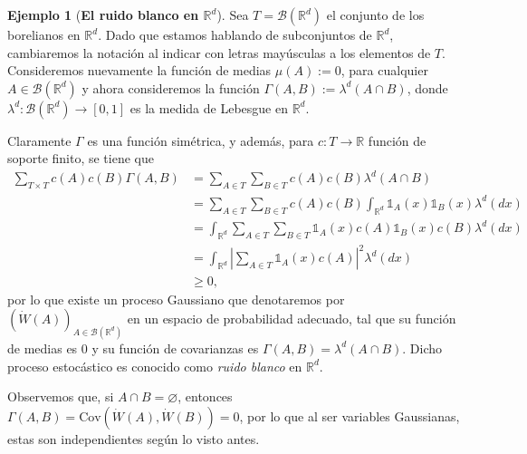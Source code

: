 \documentclass[letterpaper,twoside]{book}
\newcommand{\R}{\mathbb{R}}
\newcommand{\B}{\mathcal{B}}
\newcommand{\W}{\dot{W}}
\newcommand{\1}{\mathds{1}}
\newcommand{\abs}[1]{\left\lvert #1 \right\rvert}
\renewcommand{\to}{\rightarrow}
\theoremstyle{definition}
\theoremstyle{definition}
\theoremstyle{definition}
\theoremstyle{definition}
\theoremstyle{definition}
\theoremstyle{definition}
\newtheorem{ejem}{Ejemplo}
\theoremstyle{definition}
\begin{document}
\begin{ejem}[\textbf{El ruido blanco en $\R^{d}$}] 
Sea $T=\B(\R^{d})$ el conjunto de los borelianos en $\R^d$.
Dado que estamos hablando de subconjuntos de $\R^{d}$, cambiaremos la notación al indicar con letras mayúsculas a los elementos de $T$.
Consideremos nuevamente la función de medias $\mu(A):=0$, para cualquier $A\in \B(\R^{d})$ y ahora consideremos la función $\Gamma(A,B):=\lambda^{d}(A\cap B)$, donde $\lambda^{d}:\B(\R^{d})\to [0,1]$ es la medida de Lebesgue en $\R^{d}$.

 Claramente $\Gamma$ es una función simétrica, y además, para $c:T\to\R$ función de soporte finito, se tiene que 
 \begin{align*}
    \sum_{T\times T}^{}c(A)c(B)\Gamma(A,B)&=\sum_{A\in T}^{}\sum_{B\in T}c(A)c(B)\lambda^{d}(A\cap B)\\
    &=\sum_{A\in T}^{}\sum_{B\in T}c(A)c(B)\int_{\R^d}\1_{A}(x)\1_{B}(x)\lambda^{d}(dx)\\
    &=\int_{\R^{d}}\sum_{A\in T}\sum_{B\in T}\1_{A}(x)c(A)\1_{B}(x)c(B)\lambda^{d}(dx)\\
    &=\int_{\R^{d}}\abs{\sum_{A\in T}\1_{A}(x)c(A)}^2\lambda^{d}(dx)\\
    &\geq0,
    \end{align*}
por lo que existe un proceso Gaussiano que denotaremos por $(\dot{W}(A))_{A\in \B(\R^{d})}$ en un espacio de probabilidad adecuado, tal que su función de medias es $0$ y su función de covarianzas es $\Gamma(A,B)=\lambda^{d}(A\cap B)$. Dicho proceso estocástico es conocido como \textit{ruido blanco} en $\R^{d}$.

Observemos que, si $A\cap B=\varnothing$, entonces $\Gamma(A,B)=\text{Cov}\left(\W(A),\W(B)\right)=0$, por lo que al ser variables Gaussianas, estas son independientes según lo visto antes.


\end{ejem}
\end{document}
